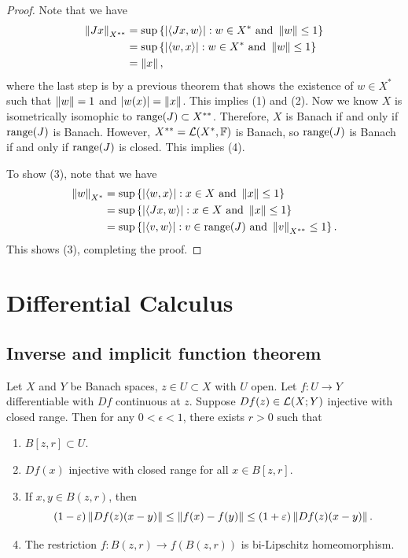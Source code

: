 \documentclass[a4paper]{article}
\begin{document}
\begin{proof}
Note that we have 
\[
\begin{aligned}
\left\lVert Jx\right\rVert_{X^{**}} 
&= \sup \left\{ \left\lvert \left\langle Jx, w \right\rangle\right\rvert: w \in X^* \text{ and } \left\lVert w\right\rVert \leq 1 \right\} \\
&= \sup \left\{ \left\lvert \left\langle w, x \right\rangle\right\rvert: w \in X^* \text{ and } \left\lVert w\right\rVert \leq 1 \right\} \\
&= \left\lVert x\right\rVert,
\end{aligned}
\]
where the last step is by a previous theorem that shows 
the existence of $w \in X^*$ such that $\left\lVert w\right\rVert = 1$ and 
$\left\lvert w(x)\right\rvert = \left\lVert x\right\rVert$. This implies (1) and (2).
Now we know $X$ is isometrically isomophic to $\operatorname{range}(J) \subset 
X^{**}$. Therefore, $X$ is Banach if and only if $\operatorname{range}(J)$ is 
Banach. However, $X^{**} = \mathcal{L}(X^*, \mathbb{F})$ is Banach, so 
$\operatorname{range}(J)$ is Banach if and only if $\operatorname{range}(J)$ is closed. 
This implies (4).

To show (3), note that we have 
\[
\begin{aligned}
\left\lVert w\right\rVert_{X^*} 
&= \sup \left\{ \left\lvert \left\langle w, x \right\rangle\right\rvert : x \in X \text{ and } \left\lVert x\right\rVert \leq 1 \right\} \\
&= \sup \left\{ \left\lvert \left\langle Jx, w \right\rangle\right\rvert : x \in X \text{ and } \left\lVert x\right\rVert \leq 1 \right\} \\
&= \sup \left\{ \left\lvert \left\langle v, w \right\rangle\right\rvert : v \in \operatorname{range}(J) \text{ and } \left\lVert v\right\rVert_{X^{**}} \leq 1 \right\}.
\end{aligned}
\]
This shows (3), completing the proof.
\end{proof}

\section{Differential Calculus}

\subsection{Inverse and implicit function theorem}

\begin{thm}
Let $X$ and $Y$ be Banach spaces, $z \in U \subset X$ 
with $U$ open. Let $f: U \to Y$ differentiable with 
$Df$ continuous at $z$. Suppose $Df(z) \in \mathcal{L}(X; Y)$ 
injective with closed range. Then for any $0 < \epsilon < 1$, 
there exists $r > 0$ such that 
\begin{enumerate}
  \item $B[z, r] \subset U$. 
  \item $Df(x)$ injective with closed range for all $x \in 
  B[z, r]$. 
  \item If $x, y \in B(z, r)$, then 
  \[
  (1 - \varepsilon) \left\lVert Df(z) (x - y)\right\rVert 
  \leq \left\lVert f(x) - f(y)\right\rVert 
  \leq (1 + \varepsilon) \left\lVert Df(z) (x - y)\right\rVert.
  \]
  \item The restriction $f: B(z, r) \to f(B(z, r))$ 
  is bi-Lipschitz homeomorphism.
\end{enumerate}
\end{thm}
\end{document}
